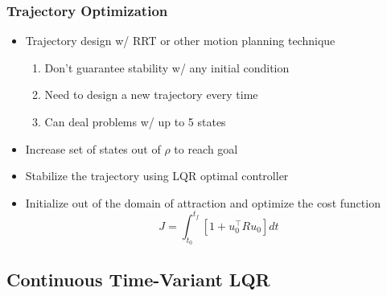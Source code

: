 \documentclass{beamer}
\begin{document}
\begin{frame}
\frametitle{Trajectory Optimization}
\begin{itemize}
\item Trajectory design w/ RRT or other motion planning technique
\begin{enumerate}
\item Don't guarantee stability w/ any initial condition
\item Need to design a new trajectory every  time
\item Can deal problems w/ up to 5 states \vspace{.2cm}
\end{enumerate}
\item Increase set of states out of $\rho$ to reach goal \vspace{.2cm}
\item Stabilize the trajectory using LQR optimal controller\vspace{.2cm}
\item Initialize out of the domain of attraction and optimize the cost function \vspace{.2cm}
\begin{equation*}
J=\int_{t_0}^{t_f}[1+u_0^{\intercal}Ru_0] dt
\end{equation*}
\end{itemize}

\end{frame}


\subsection{Continuous Time-Variant LQR}
\end{document}
